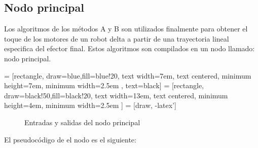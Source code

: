     \newpage
    
    \subsection{Nodo principal}\label{nodoprincipal_tray}
    Los algoritmos de los métodos A y B son utilizados finalmente para obtener el toque de los motores de un robot delta a partir de una trayectoria lineal especifica del efector final. Estos algoritmos son compilados en un nodo llamado: nodo principal. 
    
         = [rectangle, draw=blue,fill=blue!20, text width=7em, text centered, minimum height=7em, minimum width=2.5em , text=black]
         = [rectangle, draw=black!50,fill=black!20, text width=13em, text centered, minimum height=4em, minimum width=2.5em ]
         = [draw, -latex']
         \begin{center}
         \begin{figure}[htb]
                \caption{Entradas y salidas del nodo principal}
                \label{f:Cap6_funtion_1}
         \end{figure}
         \end{center}
         
    \vspace{-2em}     
    El pseudocódigo de el nodo es el siguiente:     

